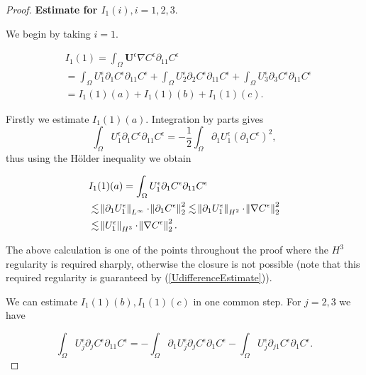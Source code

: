 \documentclass[12pt]{report}
\numberwithin{theorem}{chapter}
\numberwithin{corollary}{chapter}
\numberwithin{lemma}{chapter}
\numberwithin{remark}{chapter}
\numberwithin{definition}{chapter}
\numberwithin{prop}{chapter}
\begin{document}
\begin{proof}
\textbf{Estimate for $I_1(i), i = 1,2,3.$}

We begin by taking $i=1.$

\begin{equation}
  \begin{split}
    & I_1(1) = \int_\Omega \mathbf{U}^\epsilon \nabla C^\epsilon \partial_{11} C^\epsilon \\
    & = \int_\Omega U_1^\epsilon \partial_1 C^\epsilon \partial_{11} C^\epsilon + \int_\Omega U_2^\epsilon \partial_2 C^\epsilon \partial_{11} C^\epsilon + \int_\Omega U_3^\epsilon \partial_3 C^\epsilon \partial_{11} C^\epsilon \\
    & = I_1(1)(a) + I_1(1)(b) + I_1(1)(c).
  \end{split}
\end{equation}

Firstly we estimate $I_1(1)(a).$ Integration by parts gives
%
$$\int_\Omega U_1^\epsilon \partial_1 C^\epsilon \partial_{11} C^\epsilon = - \frac{1}{2} \int_\Omega \partial_1 U_1^\epsilon (\partial_1 C^\epsilon)^2,$$
%
thus using the H\"older inequality we obtain

\begin{equation}
  \begin{split}
    & I_1(1)(a) = \int_\Omega U_1^\epsilon \partial_1 C^\epsilon \partial_{11} C^\epsilon \\
    & \lesssim \norm{\partial_1 U_1^\epsilon}_{L^\infty} \cdot \norm{\partial_1 C^\epsilon}_2^2 \lesssim \norm{\partial_1 U_1^\epsilon}_{H^2} \cdot \norm{\nabla C^\epsilon}_2^2 \\
    & \lesssim \norm{U_1^\epsilon}_{H^3} \cdot \norm{\nabla C^\epsilon}_2^2.
  \end{split}
\end{equation}

The above calculation is one of the points throughout the proof where the $H^3$ regularity is required sharply, otherwise the closure is not possible (note that this required regularity is guaranteed by (\ref{UdifferenceEstimate})).

We can estimate $I_1(1)(b), I_1(1)(c)$ in one common step. For $j = 2,3$ we have

$$ \int_\Omega U_j^\epsilon \partial_j C^\epsilon \partial_{11} C^\epsilon = - \int_\Omega \partial_1 U_j^\epsilon \partial_j C^\epsilon \partial_1 C^\epsilon - \int_\Omega U_j^\epsilon \partial_{j1} C^\epsilon \partial_1 C^\epsilon.$$


\end{proof}
\end{document}
